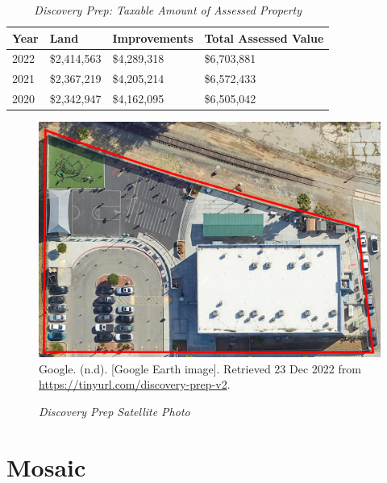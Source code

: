 \begin{table}[hbtp]
  \SingleSpacing%
  \caption[Discovery Prep: Taxable Amount of Assessed Propery]{\textit{Discovery Prep: Taxable Amount of Assessed Property}}\label{tab:discovery-prep-taxable-amount}
  \begin{tabular}{llll}
    \toprule
    Year & Land        & Improvements & Total Assessed Value \\
    \midrule
    2022 & \$2,414,563 & \$4,289,318  & \$6,703,881 \\
    2021 & \$2,367,219 & \$4,205,214  & \$6,572,433 \\
    2020 & \$2,342,947 & \$4,162,095  & \$6,505,042 \\
    \bottomrule
  \end{tabular}
\end{table}

\begin{figure}[hbtp]
  \caption[Discovery Prep Satellite Photo]{\textit{Discovery Prep Satellite Photo}}\label{fig:discovery-prep-sat-photo}
  \includegraphics[width=\textwidth]{Satellite-Photos/discovery-prep-sat-photo}\\ %
  \footnotesize{Google. (n.d). [Google Earth image]. Retrieved 23 Dec 2022 from \url{https://tinyurl.com/discovery-prep-v2}.}
\end{figure}


\clearpage
\section{Mosaic}\label{sec:mosaic-info}\indent

